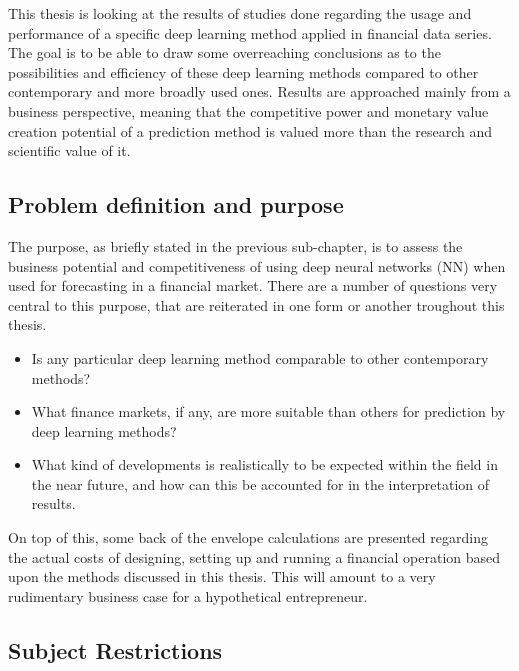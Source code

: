 This thesis is looking at the results of studies done regarding the usage and performance of a specific deep learning method applied in financial data series. The goal is to be able to draw some overreaching conclusions as to the possibilities and efficiency of these deep learning methods compared to other contemporary and more broadly used ones. Results are approached mainly from a business perspective, meaning that the competitive power and monetary value creation potential of a prediction method is valued more than the research and scientific value of it.


\subsection{Problem definition and purpose}

The purpose, as briefly stated in the previous sub-chapter, is to assess the business potential and competitiveness of using deep neural networks (NN) when used for forecasting in a financial market. There are a number of questions very central to this purpose, that are reiterated in one form or another troughout this thesis.

\begin{itemize}

\item Is any particular deep learning method comparable to other contemporary methods?

\item What finance markets, if any, are more suitable than others for prediction by deep learning methods?

\item What kind of developments is realistically to be expected within the field in the near future, and how can this be accounted for in the interpretation of results.

\end{itemize}

On top of this, some back of the envelope calculations are presented regarding the actual costs of designing, setting up and running a financial operation based upon the methods discussed in this thesis. This will amount to a very rudimentary business case for a hypothetical entrepreneur.




\subsection{Subject Restrictions}

